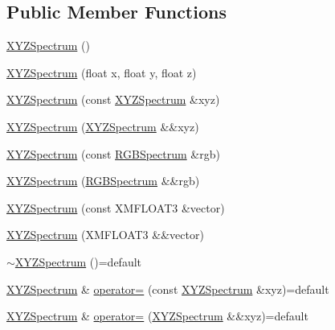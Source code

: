\subsection*{Public Member Functions}
\begin{DoxyCompactItemize}
\item 
\hyperlink{structmage_1_1_x_y_z_spectrum_a93dbb49e9cb90dd0aed70e9b6d01fcc8}{X\+Y\+Z\+Spectrum} ()
\item 
\hyperlink{structmage_1_1_x_y_z_spectrum_ab768ef493970dd791f8b145eee05f66b}{X\+Y\+Z\+Spectrum} (float x, float y, float z)
\item 
\hyperlink{structmage_1_1_x_y_z_spectrum_ac86feefa604d578f219d17f721508357}{X\+Y\+Z\+Spectrum} (const \hyperlink{structmage_1_1_x_y_z_spectrum}{X\+Y\+Z\+Spectrum} \&xyz)
\item 
\hyperlink{structmage_1_1_x_y_z_spectrum_acd737da8e445f137dae3dd886e4e822b}{X\+Y\+Z\+Spectrum} (\hyperlink{structmage_1_1_x_y_z_spectrum}{X\+Y\+Z\+Spectrum} \&\&xyz)
\item 
\hyperlink{structmage_1_1_x_y_z_spectrum_a91cf5d611fbad0e47b6718a04b9a505d}{X\+Y\+Z\+Spectrum} (const \hyperlink{structmage_1_1_r_g_b_spectrum}{R\+G\+B\+Spectrum} \&rgb)
\item 
\hyperlink{structmage_1_1_x_y_z_spectrum_a0bfea768139190f70cfef880d239b20c}{X\+Y\+Z\+Spectrum} (\hyperlink{structmage_1_1_r_g_b_spectrum}{R\+G\+B\+Spectrum} \&\&rgb)
\item 
\hyperlink{structmage_1_1_x_y_z_spectrum_a4775c0f3d8bff524281c186ee5e91e60}{X\+Y\+Z\+Spectrum} (const X\+M\+F\+L\+O\+A\+T3 \&vector)
\item 
\hyperlink{structmage_1_1_x_y_z_spectrum_a729b4911b8328806d411e60e1bd2fa6b}{X\+Y\+Z\+Spectrum} (X\+M\+F\+L\+O\+A\+T3 \&\&vector)
\item 
\hyperlink{structmage_1_1_x_y_z_spectrum_af3a318ebdb1eb1e47cd81707850049a7}{$\sim$\+X\+Y\+Z\+Spectrum} ()=default
\item 
\hyperlink{structmage_1_1_x_y_z_spectrum}{X\+Y\+Z\+Spectrum} \& \hyperlink{structmage_1_1_x_y_z_spectrum_afb9ded2a6c69514b9853f753c5f94f98}{operator=} (const \hyperlink{structmage_1_1_x_y_z_spectrum}{X\+Y\+Z\+Spectrum} \&xyz)=default
\item 
\hyperlink{structmage_1_1_x_y_z_spectrum}{X\+Y\+Z\+Spectrum} \& \hyperlink{structmage_1_1_x_y_z_spectrum_a5191cffff5e1560164a34d43aa72441b}{operator=} (\hyperlink{structmage_1_1_x_y_z_spectrum}{X\+Y\+Z\+Spectrum} \&\&xyz)=default
\end{DoxyCompactItemize}


